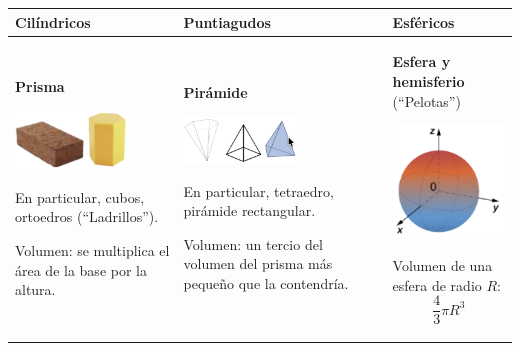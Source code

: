 \documentclass[12pt,a4paper]{article}
\begin{document}
\begin{center}
	\small
	\renewcommand{\arraystretch}{1.25}
	\begin{tabular}{|p{4cm}|p{4cm}|p{4cm}|}
		\hline
		\textbf{Cilíndricos} & \textbf{Puntiagudos} & \textbf{Esféricos} \\
		\hline

		\textbf{Prisma}\par
		{\centering \includegraphics[width=3cm]{Figuras/fig13.png}\par}
		En particular, cubos, ortoedros (``Ladrillos'').\par
		Volumen: se multiplica el área de la base por la altura.
		&
		\textbf{Pirámide}\par
		{\centering \includegraphics[width=3cm]{Figuras/fig15.png}\par}
		En particular, tetraedro, pirámide rectangular.\par
		Volumen: un tercio del volumen del prisma más pequeño que la contendría.
		&
		\textbf{Esfera y hemisferio} (``Pelotas'')\par
		{\centering \includegraphics[width=3cm]{Figuras/fig17.png}\par}
		Volumen de una esfera de radio $R$:
		\[
		\frac{4}{3}\pi R^3
		\]
		\\
		\hline
			\end{tabular}
	\end{center}
	
\end{document}
